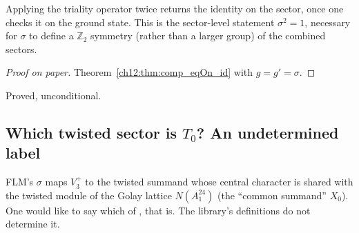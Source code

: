 \begin{physics}
Applying the triality operator twice returns the identity on the sector, once one checks it on the ground state. This is the sector-level statement $\sigma^2=1$, necessary for $\sigma$ to define a $\mathbb Z_2$ symmetry (rather than a larger group) of the combined sectors.
\end{physics}
\begin{proof}[Proof on paper]Theorem~\ref{ch12:thm:comp_eqOn_id} with $g=g'=\sigma$.\end{proof}
\begin{status}Proved, unconditional.\end{status}

\subsection{Which twisted sector is \texorpdfstring{$T_0$}{T₀}? An undetermined label}\label{ch12:sec:golayE}

FLM's $\sigma$ maps $V_3^+$ to the twisted summand whose central character is shared with the twisted
module of the Golay lattice $N(A_1^{24})$ (the ``common summand'' $X_0$).  One would like to say which of
,  that is.  The library's definitions do not determine it.

